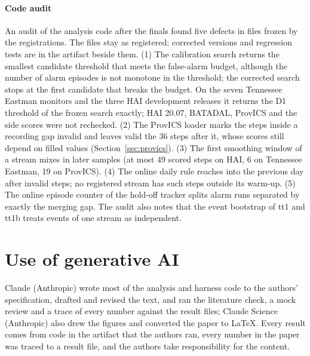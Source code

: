 \documentclass[letterpaper,twocolumn,10pt]{article}
\begin{document}
\paragraph{Code audit}
An audit of the analysis code after the finals found five defects in files frozen by the registrations.
The files stay as registered; corrected versions and regression tests are in the artifact beside them.
(1) The calibration search returns the smallest candidate threshold that meets the false-alarm budget,
although the number of alarm episodes is not monotone in the threshold; the corrected search stops at the
first candidate that breaks the budget. On the seven Tennessee Eastman monitors and the three HAI
development releases it returns the D1 threshold of the frozen search exactly; HAI 20.07, BATADAL, ProvICS
and the side scores were not rechecked. (2) The ProvICS loader marks the steps inside
a recording gap invalid and leaves valid the 36 steps after it, whose scores still depend on filled
values (Section~\ref{sec:provics}). (3) The first smoothing window of a stream mixes in later samples
(at most 49 scored steps on HAI, 6 on Tennessee Eastman, 19 on ProvICS). (4) The online daily rule reaches
into the previous day after invalid steps; no registered stream has such steps outside its warm-up. (5)
The online episode counter of the hold-off tracker splits alarm runs separated by exactly the merging
gap. The audit also notes that the event bootstrap of tt1 and tt1b treats events of one stream as
independent.

\FloatBarrier
\section*{Use of generative AI}

Claude (Anthropic) wrote most of the analysis and harness code to the authors' specification, drafted
and revised the text, and ran the literature check, a mock review and a trace of every number against
the result files; Claude Science (Anthropic) also drew the figures and converted the paper to LaTeX.
Every result comes from code in the artifact that the authors ran, every number in the paper was traced
to a result file, and the authors take responsibility for the content.
\end{document}

